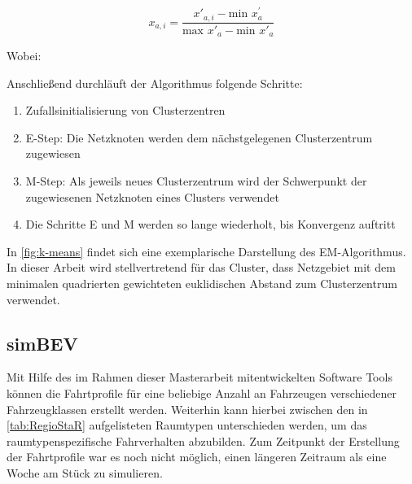 \begin{equation}
	x_{a, i} = \frac{x'_{a, i} - \text{min~} x^{'}_a}{\text{max~} x'_a - \text{min~} x'_a}
	\label{eq:norm_attributes}
\end{equation}

\noindent Wobei:


\noindent Anschließend durchläuft der Algorithmus folgende Schritte:

\begin{enumerate}
	\item Zufallsinitialisierung von Clusterzentren
	\item E-Step: Die Netzknoten werden dem nächstgelegenen Clusterzentrum zugewiesen
	\item M-Step: Als jeweils neues Clusterzentrum wird der Schwerpunkt der zugewiesenen Netzknoten eines Clusters verwendet
	\item Die Schritte E und M werden so lange wiederholt, bis Konvergenz auftritt
\end{enumerate}


In \autoref{fig:k-means} findet sich eine exemplarische Darstellung des EM-Algorithmus.
In dieser Arbeit wird stellvertretend für das Cluster, dass Netzgebiet mit dem minimalen quadrierten gewichteten euklidischen Abstand zum Clusterzentrum verwendet. \cite{Mueller2019}




\subsection{simBEV}\label{chap:simbev_theo}


Mit Hilfe des im Rahmen dieser Masterarbeit mitentwickelten Software Tools \simbev können die Fahrtprofile für eine beliebige Anzahl an Fahrzeugen verschiedener Fahrzeugklassen erstellt werden.
Weiterhin kann hierbei zwischen den in \autoref{tab:RegioStaR} aufgelisteten \Regiostar Raumtypen unterschieden werden, um das raumtypenspezifische Fahrverhalten abzubilden.
Zum Zeitpunkt der Erstellung der Fahrtprofile war es noch nicht möglich, einen längeren Zeitraum als eine Woche am Stück zu simulieren.

